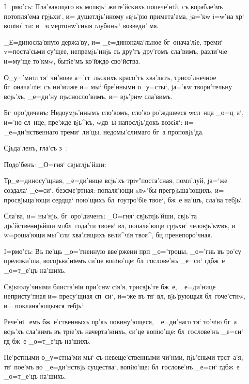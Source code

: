 
I=рмо'съ: Пла'вающаго въ молвjь` жите'йскихъ 
попече'нiй, съ корабле'мъ потопля'ема грjьхи`, и= 
душетлjь'нному sвjь'рю примета'ема, jа='кw i=w'на хр` 
вопiю' ти: и=з\ъ смертонw'сныя глубины` возведи' мя.

_Е=диносла'вную держа'ву, и= _е=динонача'льное 
бг~онача'лiе, треми` v=поста'сьми су'щее, непремjь'ннjь 
съ дру'гъ дру'гомъ сла'вимъ, разли'чiе и=му'ще то'кмw, 
бытiе'мъ ко'йждо сво'йства.

О_у='мнiи тя` чи'нове а='гг~льскихъ красо'тъ хва'лятъ, 
трисо'лнечное бг~онача'лiе: съ ни'миже и= мы` бре'нными 
о_у=сты`, jа='кw твори'тельну всjь'хъ, _е=ди'ну 
пjьсносло'вимъ, и= вjь'рнw сла'вимъ.

Бг~оро'диченъ: Недоумjь'ннымъ сло'вомъ, сло'во 
ро'ждшееся w\т сл~нца _о=ц~а`, и='но сл~нце, пре'жде 
вjь^къ, w\т дв~ы напослjь'докъ возсiя`: и= 
_е=ди'нственнаго треми` ли'цы, недомы'слимаго бг~а 
проповjь'да.

Сjьда'ленъ, гла'съ з~:

Подо'бенъ: _О=гня` свjьтлjь'йши:

Тр _е=диносу'щная, _е=ди'нице всjь'хъ 
трiv"поста'сная, поми'луй, jа=`же создала` _е=си`, 
безсме'ртная: попаля'ющи sлw'бы прегрjьша'ющихъ, и= 
просвjьща'ющи сердца` пою'щихъ бл~гоутро'бiе твое`, бж~е 
на'шъ, сла'ва тебjь`.

Сла'ва, и= ны'нjь, бг~оро'диченъ: _О=гня` 
свjьтлjь'йши, свjь'та дjь'йственнjьйши мл бл~года'ти 
твоея` вл, попаля'ющи грjьхи` человjь'кwвъ, и= 
w=роша'ющи мы^сли хва'лящихъ вели^чiя твоя^, бц 
пренепоро'чная.


I=рмо'съ: Въ пе'щь _о='гненную вве'ржени прп 
_о='троцы, _о='гнь въ ро'су преложи'ша, воспjьва'нiемъ 
си'це вопiю'ще: бл~гослове'нъ _е=си` гд бж~е _о=т_е'цъ 
на'шихъ.

Свjьтолу'чными блиста'нiи при'снw сiя'я, трисвjь'те 
бж~е, _е=ди'нице непристу'пная и= пресу'щная сп~си`, 
и=`же въ тя` вл, вjь'рующыя бл~гоче'стнw, и= 
покланя'ющыяся тебjь`.

Рече'нi_емъ бж~е'ственныхъ пр'къ повину'ющеся, 
_е=ди'наго тя` то'чiю бг~а всjь'хъ сла'вимъ въ трiе'хъ 
начерта'нiихъ, си'це вопiю'ще: бл~гослове'нъ _е=си` гд 
бж~е _о=т_е'цъ на'шихъ.

Пе'рстными о_у=стна'ми мы` съ невеще'ственными чи'нми, 
пjь'сньми тр ст~а'я, тя` пое'мъ во _е=ди'нствjь 
существа`, вопiю'ще: бл~гослове'нъ _е=си` гд бж~е 
_о=т_е'цъ на'шихъ.


